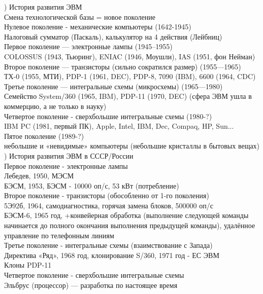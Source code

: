 ) История развития ЭВМ \\
Смена технологической базы = новое поколение \\
Нулевое поколение - механические компьютеры (1642-1945) \\
Налоговый сумматор (Паскаль), калькулятор на 4 действия (Лейбниц) \\
Первое поколение — электронные лампы (1945–1955) \\
COLOSSUS (1943, Тьюринг), ENIAC (1946, Моушли), IAS (1951, фон Нейман) \\
Второе поколение — транзисторы (сильно сократился размер) (1955—1965) \\
ТХ-0 (1955, МТИ), PDP-1 (1961, DEC), PDP-8, 7090 (IBM), 6600 (1964, CDC) \\
Третье поколение — интегральные схемы (микросхемы) (1965—1980) \\
Семейство System/360 (1965, IBM), PDP-11 (1970, DEC) (сфера ЭВМ ушла в коммерцию, а не только в науку) \\
Четвертое поколение - сверхбольшие интегральные схемы (1980-?) \\
IBM PC (1981, первый ПК), Apple, Intel, IBM, Dec, Compaq, HP, Sun... \\
Пятое поколение
(1989-?) \\
небольшие и «невидимые» компьютеры (небольшие кристаллы в бытовых вещах) \\

) История развития ЭВМ в СССР/России \\
Первое поколение - электронные лампы \\
Лебедев, 1950, МЭСМ \\
БЭСМ, 1953, БЭСМ - 10000 оп/с, 53 кВт (потребление) \\
Второе поколение - транзисторы (обособленно от 1-го поколения)\\
5Э92б, 1964, самодиагностика, горячая замена блоков, 500000 оп/с \\
БЭСМ-6, 1965 год, +конвейерная обработка (выполнение следующей команды начинается до полного окончания выполнения предыдущей команды), удалённое управление по телефонным линиям \\
Третье поколение - интегральные схемы (взаимствование с Запада) \\
Директива «Ряд», 1968 год, клонирование S/360, 1971 год -  ЕС ЭВМ \\
Клоны PDP-11 \\
Четвертое поколение - 
сверхбольшие интегральные схемы \\
Эльбрус (процессор) — разработка по настоящее время \\

